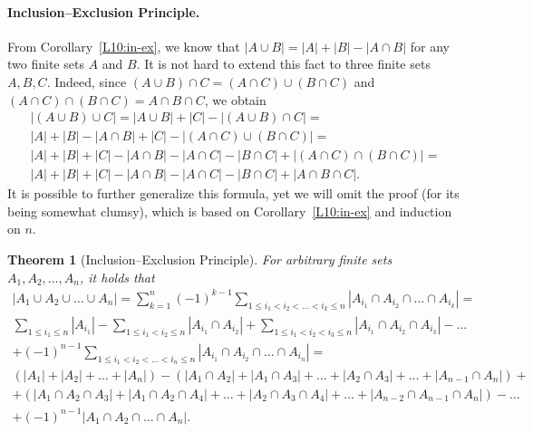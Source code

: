 \documentclass[12pt,notitlepage]{article}
\theoremstyle{plain}
\newtheorem{thm}{Theorem}[section]
\theoremstyle{definition}
\theoremstyle{plain}
\newcommand{\1}{\mathbf{1}}
\newcommand{\0}{\mathbf{0}}
\begin{document}
\paragraph{Inclusion--Exclusion Principle.} From Corollary~\ref{L10:in-ex}, we know that $|A \cup B| = |A| + |B| - |A \cap B|$ for any two finite sets $A$ and $B$. It is not hard to extend this fact to three finite sets $A, B, C$. Indeed, since $(A \cup B) \cap C = (A \cap C) \cup (B \cap C)$ and $(A \cap C) \cap (B \cap C) = A \cap B \cap C$, we obtain
\begin{multline*}
|(A \cup B) \cup C| = |A \cup B| + |C| - |(A \cup B) \cap C| =\\
 |A| + |B| - |A \cap B| + |C| - |(A \cap C) \cup (B \cap C)| =\\
  |A| + |B| + |C| - |A \cap B| - |A \cap C| - |B \cap C| + |(A \cap C) \cap (B \cap C)| =\\
 |A| + |B| + |C| - |A \cap B| - |A \cap C| - |B \cap C| + |A \cap B \cap C|.
\end{multline*}
It is possible to further generalize this formula, yet we will omit the proof (for its being somewhat clumsy), which is based on Corollary~\ref{L10:in-ex} and induction on $n$.
\begin{thm}[Inclusion--Exclusion Principle]\label{comb2:ex-in-gen}
For arbitrary finite sets $A_1, A_2, \ldots, A_n$, it holds that
\begin{multline*}
|A_1 \cup A_2 \cup \ldots \cup A_n| = \sum\limits_{k = 1}^n (-1)^{k - 1} \sum\limits_{1\leqslant i_1 < i_2 < \ldots < i_k \leqslant n} |A_{i_1} \cap A_{i_2} \cap \ldots \cap A_{i_k}| =\\
\sum\limits_{1\leqslant i_1 \leqslant n} |A_{i_1}| - \sum\limits_{1\leqslant i_1 < i_2 \leqslant n} |A_{i_1} \cap A_{i_2}| + \sum\limits_{1\leqslant i_1 < i_2 < i_3 \leqslant n} |A_{i_1} \cap A_{i_2} \cap A_{i_3}| - \ldots\\
+ (-1)^{n - 1} \sum\limits_{1\leqslant i_1 < i_2 < \ldots < i_n \leqslant n} |A_{i_1} \cap A_{i_2} \cap \ldots \cap A_{i_n}|= \\[3pt]
(|A_1| + |A_2| + \ldots + |A_n|) - (|A_1 \cap A_2| + |A_1 \cap A_3| +  \ldots + |A_2 \cap A_3| + \ldots + |A_{n -1} \cap A_n|) +\\[3pt]
+ (|A_1 \cap A_2 \cap A_3| + |A_1 \cap A_2 \cap A_4| +  \ldots + |A_2 \cap A_3 \cap A_4| + \ldots + |A_{n -2} \cap A_{n -1} \cap A_n|) - \ldots\\[3pt]
+ (-1)^{n - 1} |A_1 \cap A_2 \cap \ldots \cap A_n|.\\
\end{multline*}
\end{thm}
\end{document}
